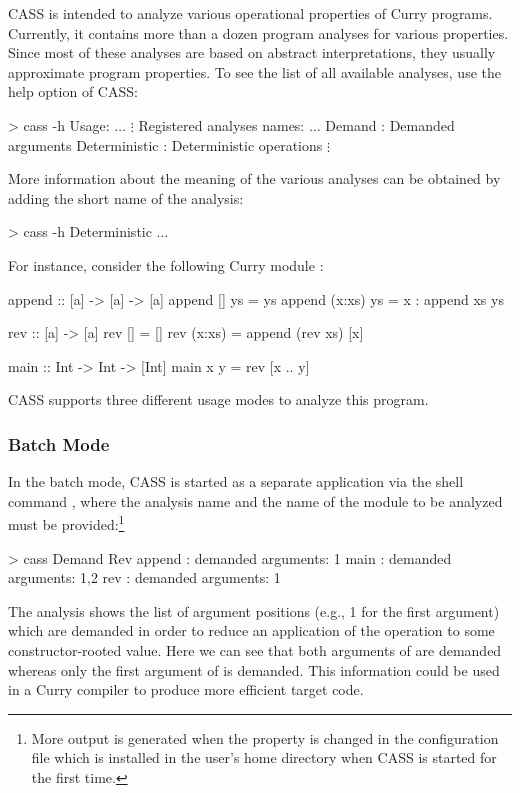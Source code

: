 CASS is intended to analyze various operational properties
of Curry programs. Currently, it contains more than a dozen
program analyses for various properties.
Since most of these analyses are based on abstract interpretations,
they usually approximate program properties.
To see the list of all available analyses, use the help option of CASS:
\begin{curry}
> cass -h
Usage: $\ldots$
$\vdots$
Registered analyses names:
$\ldots$
Demand          : Demanded arguments
Deterministic   : Deterministic operations
$\vdots$
\end{curry}
More information about the meaning of the various analyses
can be obtained by adding the short name of the analysis:
\begin{curry}
> cass -h Deterministic
$\ldots$
\end{curry}
For instance, consider the following Curry module :
\begin{curry}
append :: [a] -> [a] -> [a]
append []     ys = ys
append (x:xs) ys = x : append xs ys

rev :: [a] -> [a]
rev []     = []
rev (x:xs) = append (rev xs) [x]

main :: Int -> Int -> [Int]
main x y = rev [x .. y]
\end{curry}
%
CASS supports three different usage modes to analyze this program.

\subsubsection{Batch Mode}

In the batch mode, CASS is started as a separate application
via the shell command ,
where the analysis name and the name of the module to be analyzed
must be provided:\footnote{More output is generated when
the property  is changed in the configuration file
 which is installed in the user's home directory
when CASS is started for the first time.}
\begin{curry}
> cass Demand Rev
append : demanded arguments: 1
main : demanded arguments: 1,2
rev : demanded arguments: 1
\end{curry}
The  analysis shows the list of argument positions
(e.g., 1 for the first argument) which are demanded in order
to reduce an application of the operation to some constructor-rooted value.
Here we can see that both arguments of  are demanded
whereas only the first argument of  is demanded.
This information could be used in a Curry compiler
to produce more efficient target code.

